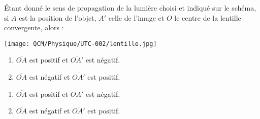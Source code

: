 \documentclass[avery5371]{flashcards}
\begin{document}
\begin{flashcard}[]{
\color{black}
\vspace{0.12\textheight}
\RaggedRight
\begin{minipage}[t]{0.55\linewidth}
\RaggedRight
Étant donné le sens de propagation de la lumière choisi et indiqué sur le schéma, si $A$ est la position de l'objet, $A'$ celle de l'image et $O$ le centre de la lentille convergente, alors :
\end{minipage}%
\hfill
\begin{minipage}[t]{0.4\linewidth}
    \strut\vspace*{-\baselineskip}\newline
    \texttt{[image: QCM/Physique/UTC-002/lentille.jpg]}
\end{minipage}%
\newline
\begin{minipage}[l]{0.45\linewidth}
    \begin{enumerate}
        \item $\overline{OA}$ est positif et $\overline{OA'}$ est négatif.
        \item $\overline{OA}$ est négatif et $\overline{OA'}$ est positif.
    \end{enumerate}
\end{minipage}
\hfill
\begin{minipage}[r]{0.45\linewidth}
    \begin{enumerate}
        \item $\overline{OA}$ est positif et $\overline{OA'}$ est négatif.
        \item $\overline{OA}$ est négatif et $\overline{OA'}$ est positif.
    \end{enumerate}    
\end{minipage}

}

\color{white}



\end{flashcard}
\end{document}
